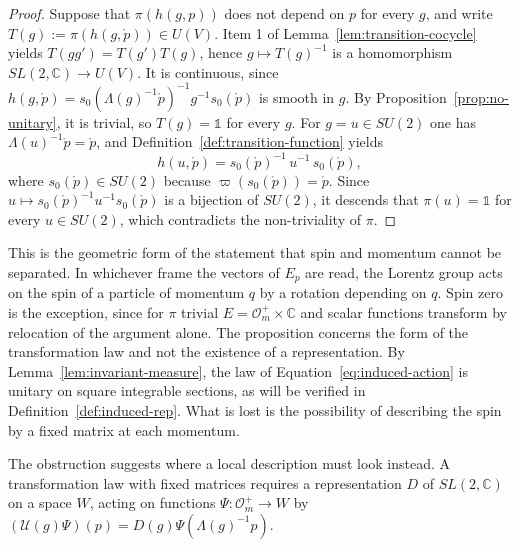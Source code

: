 \begin{proof}
	Suppose that $\pi(h(g,p))$ does not depend on $p$ for every $g$, and write $T(g):=\pi(h(g,\mathring{p}))\in U(V)$. Item 1 of Lemma~\ref{lem:transition-cocycle} yields $T(gg')=T(g')T(g)$, hence $g\mapsto T(g)^{-1}$ is a homomorphism $SL(2,\mathbb{C})\to U(V)$. It is continuous, since $h(g,\mathring{p})=s_0(\Lambda(g)^{-1}\mathring{p})^{-1}g^{-1}s_0(\mathring{p})$ is smooth in $g$. By Proposition~\ref{prop:no-unitary}, it is trivial, so $T(g)=\mathbb{1}$ for every $g$. For $g=u\in SU(2)$ one has $\Lambda(u)^{-1}\mathring{p}=\mathring{p}$, and Definition~\ref{def:transition-function} yields
	\begin{equation*}
		h(u,\mathring{p})=s_0(\mathring{p})^{-1}\,u^{-1}\,s_0(\mathring{p}),
	\end{equation*}
	where $s_0(\mathring{p})\in SU(2)$ because $\varpi(s_0(\mathring{p}))=\mathring{p}$. Since $u\mapsto s_0(\mathring{p})^{-1}u^{-1}s_0(\mathring{p})$ is a bijection of $SU(2)$, it descends that $\pi(u)=\mathbb{1}$ for every $u\in SU(2)$, which contradicts the non-triviality of $\pi$.
\end{proof}

\begin{remark}
	This is the geometric form of the statement that spin and momentum cannot be separated. In whichever frame the vectors of $E_p$ are read, the Lorentz group acts on the spin of a particle of momentum $q$ by a rotation depending on $q$. Spin zero is the exception, since for $\pi$ trivial $E=\mathcal{O}_m^+\times\mathbb{C}$ and scalar functions transform by relocation of the argument alone. The proposition concerns the form of the transformation law and not the existence of a representation. By Lemma~\ref{lem:invariant-measure}, the law of Equation~\eqref{eq:induced-action} is unitary on square integrable sections, as will be verified in Definition~\ref{def:induced-rep}. What is lost is the possibility of describing the spin by a fixed matrix at each momentum.
\end{remark}

The obstruction suggests where a local description must look instead. A transformation law with fixed matrices requires a representation $D$ of $SL(2,\mathbb{C})$ on a space $W$, acting on functions $\Psi:\mathcal{O}_m^+\to W$ by $(\mathcal{U}(g)\Psi)(p)=D(g)\Psi(\Lambda(g)^{-1}p)$.

